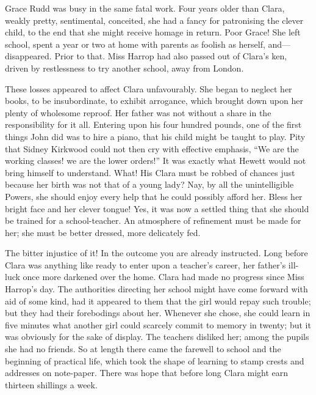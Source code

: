 Grace Rudd was busy in the same fatal work. Four years older than Clara,
weakly pretty, sentimental, conceited, she had a fancy for patronising
the clever child, to the end that she might receive homage in return.
Poor Grace! She left school, spent a year or two at home with parents as
foolish as herself, and---disappeared. Prior to that. Miss Harrop had
also passed out of Clara's ken, driven by restlessness to try another
school, away from London.

These losses appeared to affect Clara unfavourably. She began to neglect
her books, to be insubordinate, to exhibit arrogance, which brought down
upon her plenty of {\protect\hypertarget{196}{}{}}wholesome reproof. Her
father was not without a share in the responsibility for it all.
Entering upon his four hundred pounds, one of the first things John did
was to hire a piano, that his child might be taught to play. Pity that
Sidney Kirkwood could not then cry with effective emphasis, ``We are the
working classes! we are the lower orders!'' It was exactly what Hewett
would not bring himself to understand. What! His Clara must be robbed of
chances just because her birth was not that of a young lady? Nay, by all
the unintelligible Powers, she should enjoy every help that he could
possibly afford her. Bless her bright face and her clever tongue! Yes,
it was now a settled thing that she should be trained for a
school-teacher. An atmosphere of refinement must be made for her; she
must be better dressed, more delicately fed.

The bitter injustice of it! In the outcome you are already instructed.
Long before Clara was anything like ready to enter upon a teacher's
career, her father's ill-luck once {\protect\hypertarget{197}{}{}}more
darkened over the home. Clara had made no progress since Miss Harrop's
day. The authorities directing her school might have come forward with
aid of some kind, had it appeared to them that the girl would repay such
trouble; but they had their forebodings about her. Whenever she chose,
she could learn in five minutes what another girl could scarcely commit
to memory in twenty; but it was obviously for the sake of display. The
teachers disliked her; among the pupils she had no friends. So at length
there came the farewell to school and the beginning of practical life,
which took the shape of learning to stamp crests and addresses on
note-paper. There was hope that before long Clara might earn thirteen
shillings a week.

